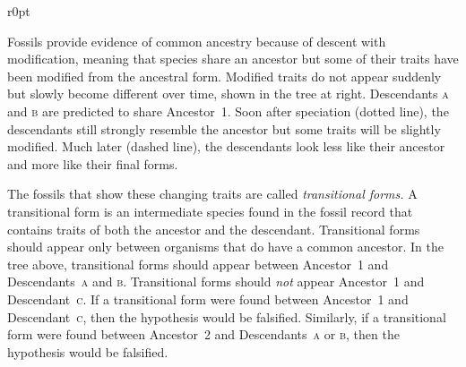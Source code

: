 \documentclass[12pt, hidelinks]{exam}
\begin{document}
\begin{wrapfigure}[13]{r}{0pt}
\end{wrapfigure}Fossils provide evidence of common ancestry because of descent with modification, meaning that species share an ancestor but some of their traits have been modified from the ancestral form. Modified traits do not appear suddenly but slowly become different over time, shown in the tree at right. Descendants \textsc{a} and \textsc{b} are predicted to share Ancestor~1. Soon after speciation (dotted line), the descendants still strongly resemble the ancestor but some traits will be slightly modified. Much later (dashed line), the descendants look less like their ancestor and more like their final forms. 

The fossils that show these changing traits are called \textit{transitional forms.} A transitional form is an intermediate species found in the fossil record that contains traits of both the ancestor and the descendant. Transitional forms should appear only between organisms that do have a common ancestor.  In the tree above, transitional forms should appear between Ancestor~1 and Descendants~\textsc{a} and \textsc{b}. Transitional forms should \textit{not} appear Ancestor~1 and Descendant~\textsc{c}.  If a transitional form were found between Ancestor~1 and Descendant~\textsc{c}, then the hypothesis would be falsified. Similarly, if a transitional form were found between Ancestor~2 and Descendants~\textsc{a} or \textsc{b}, then the hypothesis would be falsified.
\end{document}
